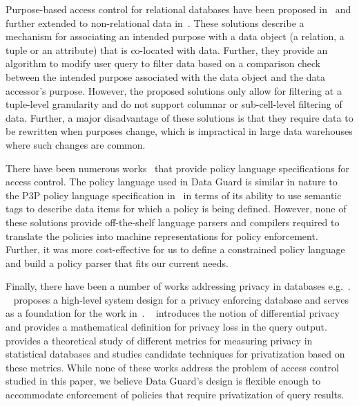 Purpose-based access control for relational databases have been proposed in~\cite{Byun05, Bertino05} and further extended to non-relational data in~\cite{Byun08}. These solutions describe a mechanism for associating an intended purpose with a data object (a relation, a tuple or an attribute) that is co-located with data. Further, they provide an algorithm to modify user query to filter data based on a comparison check between the intended purpose associated with the data object and the data accessor's purpose. However, the proposed solutions only allow for filtering at a tuple-level granularity and do not support columnar or sub-cell-level filtering of data. Further, a major disadvantage of these solutions is that they require data to be rewritten when purposes change, which is impractical in large data warehouses where such changes are common. 

There have been numerous works~\cite{Cranor02,Ni08,Xacml3} that provide policy language specifications for access control. The policy language used in Data Guard is similar in nature to the P3P policy language specification in~\cite{Cranor02} in terms of its ability to use semantic tags to describe data items for which a policy is being defined. However, none of these solutions provide off-the-shelf language parsers and compilers required to translate the policies into machine representations for policy enforcement. Further, it was more cost-effective for us to define a constrained policy language and build a policy parser that fits our current needs. 

Finally, there have been a number of works addressing privacy in databases e.g.~\cite{Agrawal02, Chawla05, Dwork06}. ~\cite{Agrawal02} proposes a high-level system design for a privacy enforcing database and serves as a foundation for the work in~\cite{Agrawal05}. ~\cite{Dwork06} introduces the notion of differential privacy and provides a mathematical definition for privacy loss in the query output. ~\cite{Chawla05} provides a theoretical study of different metrics for measuring privacy in statistical databases and studies candidate techniques for privatization based on these metrics. While none of these works address the problem of access control studied in this paper, we believe Data Guard's design is flexible enough to accommodate enforcement of policies that require privatization of query results.